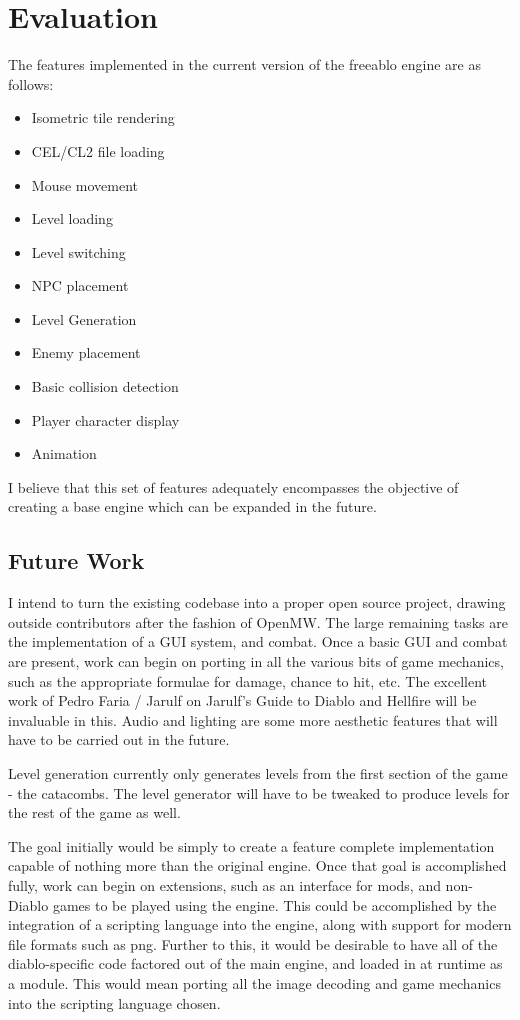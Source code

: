 \chapter{Evaluation}
	The features implemented in the current version of the freeablo engine are as follows:\\
	\begin{itemize}
		\item{Isometric tile rendering}
		\item{CEL/CL2 file loading}
		\item{Mouse movement}
		\item{Level loading}
		\item{Level switching}
		\item{NPC placement}
		\item{Level Generation}
		\item{Enemy placement}
		\item{Basic collision detection}
		\item{Player character display}
		\item{Animation}
	\end{itemize}
	
	I believe that this set of features adequately encompasses the objective of creating a base engine which can be expanded in the future.
	
	\section{Future Work}
	I intend to turn the existing codebase into a proper open source project, drawing outside contributors after the fashion of OpenMW\cite{openmw}. The large remaining tasks are the implementation of a GUI system, and combat.
	Once a basic GUI and combat are present, work can begin on porting in all the various bits of game mechanics, such as the appropriate formulae for damage, chance to hit, etc. The excellent work of Pedro Faria / Jarulf on Jarulf's Guide to Diablo and Hellfire\cite{jarulf} will be invaluable in this.
	Audio and lighting are some more aesthetic features that will have to be carried out in the future.
	
	Level generation currently only generates levels from the first section of the game - the catacombs. The level generator will have to be tweaked to produce levels for the rest of the game as well.
	
	The goal initially would be simply to create a feature complete implementation capable of nothing more than the original engine. Once that goal is accomplished fully, work can begin on extensions, such as an interface for mods, and non-Diablo games to be played using the engine.
	This could be accomplished by the integration of a scripting language into the engine, along with support for modern file formats such as png. 
	Further to this, it would be desirable to have all of the diablo-specific code factored out of the main engine, and loaded in at runtime as a module. This would mean porting all the image decoding and game mechanics into the scripting language chosen.
	
